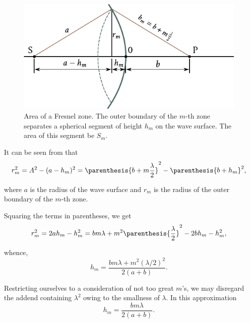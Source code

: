 \begin{figure}[!htb]
	\begin{center}
		\includegraphics[scale=1]{figures/ch_18/fig_18_5.pdf}
        \caption[]{Area of a Fresnel zone. The outer boundary of the $m$-th zone separates a spherical segment of height $h_m$ on the wave surface. The area of this segment be $S_m$.}
		\label{fig:18_5}
	\end{center}
	\vspace{-0.8cm}
\end{figure}

It can be seen from  that
\begin{equation*}
    r_m^2 = A^2 - (a - h_m)^2 = \parenthesis{b + m\frac{\lambda}{2}}^2 - \parenthesis{b + h_m}^2,
\end{equation*}

\noindent
where $a$ is the radius of the wave surface and $r_m$ is the radius of the outer boundary of the $m$-th zone.

Squaring the terms in parentheses, we get
\begin{equation}\label{eq:18_5}
    r_m^2 = 2ah_m - h_m^2 = bm\lambda + m^2\parenthesis{\frac{\lambda}{2}}^2 - 2bh_m - h_m^2,
\end{equation}

\noindent
whence,
\begin{equation}\label{eq:18_6}
    h_m = \frac{bm\lambda + m^2 (\lambda/2)^2}{2(a+b)}.
\end{equation}

\noindent
Restricting ourselves to a consideration of not too great $m$'s, we may disregard the addend containing $\lambda^2$ owing to the smallness of $\lambda$.
In this approximation
\begin{equation}\label{eq:18_7}
    h_m = \frac{bm\lambda}{2(a+b)}.
\end{equation}

